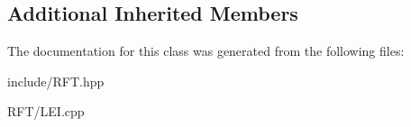 \subsection*{Additional Inherited Members}


The documentation for this class was generated from the following files\+:\begin{DoxyCompactItemize}
\item 
include/R\+F\+T.\+hpp\item 
R\+F\+T/L\+E\+I.\+cpp\end{DoxyCompactItemize}
